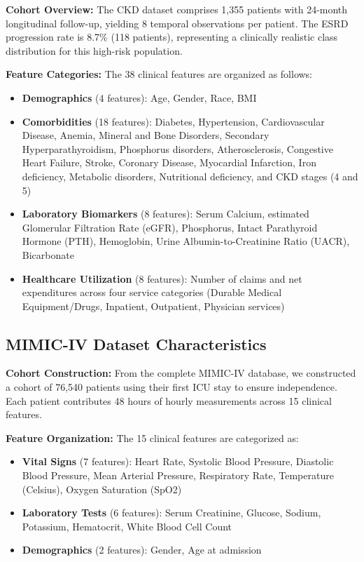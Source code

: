 \documentclass[letterpaper]{article}
\begin{document}
\begin{enumerate}
\textbf{Cohort Overview:} The CKD dataset comprises 1,355 patients with 24-month longitudinal follow-up, yielding 8 temporal observations per patient. The ESRD progression rate is 8.7\% (118 patients), representing a clinically realistic class distribution for this high-risk population.

\textbf{Feature Categories:} The 38 clinical features are organized as follows:
\begin{itemize}
    \item \textbf{Demographics} (4 features): Age, Gender, Race, BMI
    \item \textbf{Comorbidities} (18 features): Diabetes, Hypertension, Cardiovascular Disease, Anemia, Mineral and Bone Disorders, Secondary Hyperparathyroidism, Phosphorus disorders, Atherosclerosis, Congestive Heart Failure, Stroke, Coronary Disease, Myocardial Infarction, Iron deficiency, Metabolic disorders, Nutritional deficiency, and CKD stages (4 and 5)
    \item \textbf{Laboratory Biomarkers} (8 features): Serum Calcium, estimated Glomerular Filtration Rate (eGFR), Phosphorus, Intact Parathyroid Hormone (PTH), Hemoglobin, Urine Albumin-to-Creatinine Ratio (UACR), Bicarbonate
    \item \textbf{Healthcare Utilization} (8 features): Number of claims and net expenditures across four service categories (Durable Medical Equipment/Drugs, Inpatient, Outpatient, Physician services)
\end{itemize}

\subsection{MIMIC-IV Dataset Characteristics}

\textbf{Cohort Construction:} From the complete MIMIC-IV database, we constructed a cohort of 76,540 patients using their first ICU stay to ensure independence. Each patient contributes 48 hours of hourly measurements across 15 clinical features.

\textbf{Feature Organization:} The 15 clinical features are categorized as:
\begin{itemize}
    \item \textbf{Vital Signs} (7 features): Heart Rate, Systolic Blood Pressure, Diastolic Blood Pressure, Mean Arterial Pressure, Respiratory Rate, Temperature (Celsius), Oxygen Saturation (SpO2)
    \item \textbf{Laboratory Tests} (6 features): Serum Creatinine, Glucose, Sodium, Potassium, Hematocrit, White Blood Cell Count
    \item \textbf{Demographics} (2 features): Gender, Age at admission
\end{itemize}


\end{enumerate}
\end{document}
